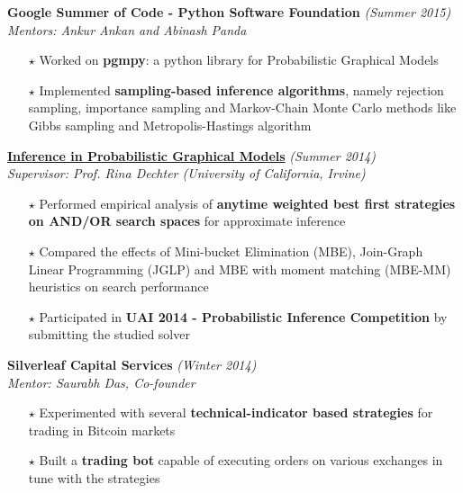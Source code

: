 \documentclass[a4paper]{article}
\begin{document}
\textbf{Google Summer of Code - Python Software Foundation}
\hfill{\sl \small (Summer 2015)}\\
\emph{Mentors: Ankur Ankan and Abinash Panda}\\
\vspace{-17pt}
\begin{itemize}[itemsep = -0.5 mm, leftmargin=*]
 \item[$\star$] Worked on \textbf{pgmpy}: a python library for Probabilistic Graphical Models
 \item[$\star$] Implemented \textbf{sampling-based inference algorithms}, namely rejection sampling, importance sampling and Markov-Chain Monte Carlo methods like Gibbs sampling and Metropolis-Hastings algorithm
\end{itemize}
\textbf{\href{http://www.ics.uci.edu/~pratyas/report2014.pdf}{Inference in Probabilistic Graphical Models}}
\hfill{\sl \small (Summer 2014)}\\
\emph{Supervisor: Prof. Rina Dechter (University of California, Irvine)}\\
\vspace{-17pt}
\begin{itemize}[itemsep = -0.5 mm, leftmargin=*]
 \item[$\star$] Performed empirical analysis of \textbf{anytime weighted best first strategies on AND/OR search spaces} for approximate inference 
 \item[$\star$] Compared the effects of Mini-bucket Elimination (MBE), Join-Graph Linear Programming (JGLP) and MBE with moment matching (MBE-MM) heuristics on search performance
 \item[$\star$] Participated in \textbf{UAI 2014 - Probabilistic Inference Competition} by submitting the studied solver
\end{itemize}\clearpage
\hspace{-0.5cm}\textbf{Silverleaf Capital Services}
\hfill{\sl \small (Winter 2014)}\\
\emph{Mentor: Saurabh Das, Co-founder}\\
\vspace{-17pt}
\begin{itemize}[itemsep = -0.5 mm, leftmargin=*]
 \item[$\star$] Experimented with several \textbf{technical-indicator based strategies} for trading in Bitcoin markets
 \item[$\star$] Built a \textbf{trading bot} capable of executing orders on various exchanges in tune with the strategies 
\end{itemize}
\vspace{-8pt}
\end{document}

